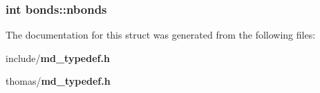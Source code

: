 \subsubsection{\setlength{\rightskip}{0pt plus 5cm}int {\bf bonds::nbonds}}\label{structbonds_0415feb6ff6ca2cd63a27a305ec0c1fc}




The documentation for this struct was generated from the following files:\begin{CompactItemize}
\item 
include/{\bf md\_\-typedef.h}\item 
thomas/{\bf md\_\-typedef.h}\end{CompactItemize}
